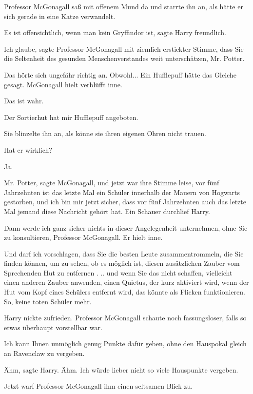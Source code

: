Professor McGonagall saß mit offenem Mund da und starrte ihn an, als hätte er
sich gerade in eine Katze verwandelt.

\glqq Es ist offensichtlich, wenn man kein Gryffindor ist\grqq{}, sagte Harry
freundlich.

\glqq Ich glaube\grqq{}, sagte Professor McGonagall mit ziemlich erstickter
Stimme, \glqq dass Sie die Seltenheit des gesunden Menschenverstandes weit
unterschätzen, Mr. Potter.\grqq{}

Das hörte sich ungefähr richtig an. Obwohl... \glqq Ein Hufflepuff hätte das
Gleiche gesagt.\grqq{} McGonagall hielt verblüfft inne.

\glqq Das ist wahr.\grqq{}

\glqq Der Sortierhut hat mir Hufflepuff angeboten.\grqq{}

Sie blinzelte ihn an, als könne sie ihren eigenen Ohren nicht trauen.

\glqq Hat er wirklich?\grqq{}

\glqq Ja.\grqq{}

\glqq Mr. Potter\grqq{}, sagte McGonagall, und jetzt war ihre Stimme leise,
\glqq vor fünf Jahrzehnten ist das letzte Mal ein Schüler innerhalb der Mauern
von Hogwarts gestorben, und ich bin mir jetzt sicher, dass vor fünf Jahrzehnten
auch das letzte Mal jemand diese Nachricht gehört hat.\grqq{} Ein Schauer
durchlief Harry.

\glqq Dann werde ich ganz sicher nichts in dieser Angelegenheit unternehmen,
ohne Sie zu konsultieren, Professor McGonagall.\grqq{} Er hielt inne.

\glqq Und darf ich vorschlagen, dass Sie die besten Leute zusammentrommeln, die
Sie finden können, um zu sehen, ob es möglich ist, diesen zusätzlichen Zauber
vom Sprechenden Hut zu entfernen . .. und wenn Sie das nicht schaffen,
vielleicht einen anderen Zauber anwenden, einen Quietus, der kurz aktiviert
wird, wenn der Hut vom Kopf eines Schülers entfernt wird, das könnte als Flicken
funktionieren. So, keine toten Schüler mehr.\grqq{}

Harry nickte zufrieden. Professor McGonagall schaute noch fassungsloser, falls
so etwas überhaupt vorstellbar war.

\glqq Ich kann Ihnen unmöglich genug Punkte dafür geben, ohne den Hauspokal
gleich an Ravenclaw zu vergeben.\grqq{}

\glqq Ähm\grqq{}, sagte Harry. \glqq Ähm. Ich würde lieber nicht so viele
Hauspunkte vergeben.\grqq{}

Jetzt warf Professor McGonagall ihm einen seltsamen Blick zu.


